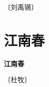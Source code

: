 \documentclass[12pt,UTF-8,openany,fontset=none]{ctexbook}
\begin{document}
\begin{center}
    \vspace{10pt}
    
    \begin{large}
        
        〔刘禹锡〕
        
    \end{large}
    
    \vspace{8pt}
    
    \begin{huge}
        
        \phantom{。}

        \phantom{。}
        
        \phantom{。}

        \phantom{。}
        
    \end{huge}
    
\end{center}

\vspace{8pt}
\clearpage


\section{江南春}



\begin{center}
    {\bfseries 江南春}
\end{center}

\begin{center}
    \vspace{10pt}
    
    \begin{large}
        
        〔杜牧〕
        
    \end{large}
    
    \vspace{8pt}
    
    \begin{huge}
        
        \phantom{。}

        \phantom{。}
        
        \phantom{。}~~

        \phantom{。}
        
    \end{huge}
    
\end{center}
\end{document}
